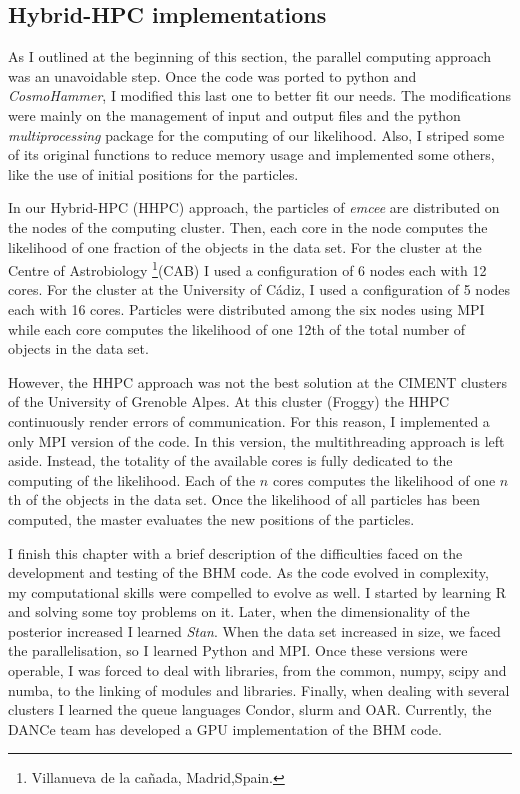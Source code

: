 \subsection{Hybrid-HPC implementations}
\label{sect:HHPC}
As I outlined at the beginning of this section, the parallel computing approach was an unavoidable step. Once the code was ported to python and \emph{CosmoHammer}, I modified this last one to better fit our needs. The modifications were mainly on the management of input and output files and the python \emph{multiprocessing} package for the computing of our likelihood. Also, I striped some of its original functions to reduce memory usage and implemented some others, like the use of initial positions for the particles.

In our Hybrid-HPC (HHPC) approach, the particles of \emph{emcee} are distributed on the nodes of the computing cluster. Then, each core in the node computes the likelihood of one fraction of the objects in the data set. For the cluster at the Centre of Astrobiology
\footnote{Villanueva de la ca\~nada, Madrid,Spain.}(CAB) I used a configuration of 6 nodes each with 12 cores. For the cluster at the University of C\'adiz, I used a configuration of 5 nodes each with 16 cores. Particles were distributed among the six nodes using MPI while each core computes the likelihood of one 12th of the total number of objects in the data set.

However, the HHPC approach was not the best solution at the CIMENT clusters of the University of Grenoble Alpes. At this cluster (Froggy) the HHPC continuously render errors of communication. For this reason, I implemented a only MPI version of the code. In this version, the multithreading approach is left aside. Instead, the totality of the available cores is fully dedicated to the computing of the likelihood. Each of the $n$ cores computes the likelihood of one $n$th of the objects in the data set. Once the likelihood of all particles has been computed, the master evaluates the new positions of the particles.

I finish this chapter with a brief description of the difficulties faced on the development and testing of the BHM code. As the code evolved in complexity, my computational skills were compelled to evolve as well. I started by learning R and solving some toy problems on it. Later, when the dimensionality of the posterior increased I learned \emph{Stan}. When the data set increased in size, we faced the parallelisation, so I learned Python and MPI. Once these versions were operable, I was forced to deal with libraries, from the common, numpy, scipy and numba, to the linking of modules and libraries. Finally, when dealing with several clusters I learned the queue languages Condor, slurm and OAR. Currently, the DANCe team has developed a GPU implementation of the BHM code.  



